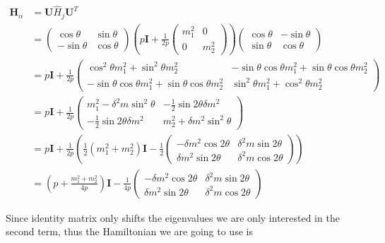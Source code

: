 \documentclass{tufte-handout}
\begin{document}
\begin{align*}
\mathbf H_{\alpha} & = \mathbf U \hat H_j  \mathbf U^T \\
& =  \begin{pmatrix}  \cos\theta & \sin\theta \\ -\sin\theta  & \cos\theta \end{pmatrix} \left( p \mathbf I + \frac{1}{2p}\begin{pmatrix} m_1^2 & 0 \\ 0 & m_2^2 \end{pmatrix} \right)   \begin{pmatrix}  \cos\theta & -\sin\theta \\ \sin\theta & \cos\theta \end{pmatrix} \\
& = p \mathbf I + \frac{1}{2p} \begin{pmatrix} \cos^2\theta m_1^2 + \sin^2\theta m_2^2 & -\sin\theta\cos\theta m_1^2 + \sin\theta\cos\theta m_2^2 \\ -\sin\theta\cos\theta m_1^2 + \sin\theta\cos\theta m_2^2 & \sin^2\theta m_1^2 + \cos^2\theta m_2^2 \end{pmatrix} \\
& = p \mathbf I + \frac{1}{2p} \begin{pmatrix} m_1^2 - \delta^2 m \sin^2\theta & -\frac{1}{2}\sin 2\theta  \delta m^2  \\ -\frac{1}{2}\sin 2\theta  \delta m^2  & m_2^2+ \delta m^2 \sin^2\theta \end{pmatrix} \\
& = p \mathbf I + \frac{1}{2p} \left( \frac{1}{2}(m_1^2+m_2^2) \mathbf I -   \frac{1}{2}\begin{pmatrix} - \delta m^2 \cos 2\theta & \delta^2 m \sin 2\theta \\  \delta m^2 \sin 2\theta & \delta^2 m\cos 2\theta \end{pmatrix} \right) \\
& = \left(p + \frac{m_1^2+m_2^2}{4p} \right)\mathbf I - \frac{1}{4p}\begin{pmatrix} - \delta m^2 \cos 2\theta & \delta^2 m \sin 2\theta \\  \delta m^2 \sin 2\theta & \delta^2 m\cos 2\theta \end{pmatrix}
\end{align*}

Since identity matrix only shifts the eigenvalues we are only interested in the second term, thus the Hamiltonian we are going to use is
\end{document}
